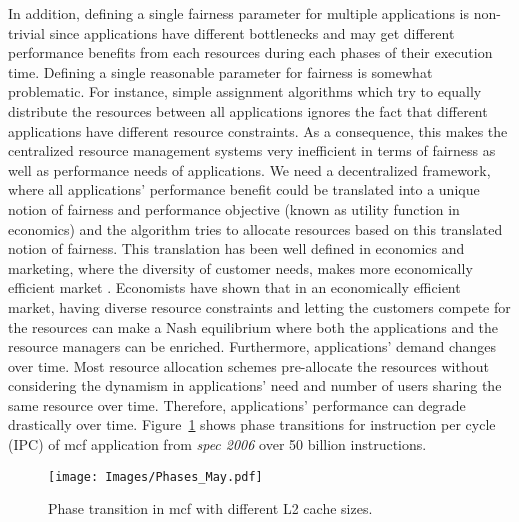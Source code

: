 \indent In addition, defining a single fairness parameter for multiple applications is non-trivial since applications have different bottlenecks and may get different performance benefits from each resources during each phases of their execution time. Defining a single reasonable parameter for fairness is somewhat problematic. For instance, simple assignment algorithms which try to equally distribute the resources between all applications ignores the fact that different applications have different resource constraints. As a consequence, this makes the centralized resource management systems very inefficient in terms of fairness as well as performance needs of applications. We need a decentralized framework, where all applications' performance benefit could be translated into a unique notion of fairness and performance objective (known as utility function in economics) and the algorithm tries to allocate resources based on this translated notion of fairness. This translation has been well defined in economics and marketing, where the diversity of customer needs, makes more economically efficient market \cite{zhou2014sharing}. Economists have shown that in an economically efficient market, having diverse resource constraints and letting the customers compete for the resources can make a Nash equilibrium where both the applications and the resource managers can be enriched. Furthermore, applications' demand changes over time. Most resource allocation schemes pre-allocate the resources without considering the dynamism in applications' need and number of users sharing the same resource over time. Therefore, applications' performance can degrade drastically over time. Figure~\ref{fig:Phases} shows phase transitions for instruction per cycle (IPC) of mcf application from \textit{spec 2006} over 50 billion instructions. \\
\begin{figure}[!tb]
\centering
\texttt{[image: Images/Phases\_May.pdf]} %
\vspace{-1.5\baselineskip}
\caption{\label{fig:Phases}Phase transition in mcf with different L2 cache sizes.}
\vspace{-1.0\baselineskip}
\end{figure}
